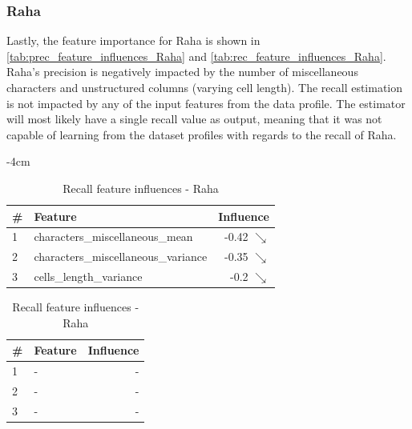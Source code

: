 

\subsubsection{Raha}
Lastly, the feature importance for Raha is shown in \autoref{tab:prec_feature_influences_Raha} and \autoref{tab:rec_feature_influences_Raha}.
Raha's precision is negatively impacted by the number of miscellaneous characters and unstructured columns (varying cell length). The recall estimation is not impacted by any of the input features from the data profile. The estimator will most likely have a single recall value as output, meaning that it was not capable of learning from the dataset profiles with regards to the recall of Raha. 

\begin{table}[H]
	\centering
	\addtolength{\leftskip} {-4cm}
	\addtolength{\rightskip}{-4cm}
	\captionsetup[subtable]{position = below}
	\captionsetup[table]{position=top}
	\caption{Top feature influences - Raha}
	\label{tab:feature_influences_Raha}
		\begin{subtable}{0.5\linewidth}
		\centering
		\begin{tabular}{llr}
\toprule
 \# &                              Feature &         Influence \\
\midrule
 1 &      characters\_miscellaneous\_mean &  -0.42 $\searrow$ \\
 2 &  characters\_miscellaneous\_variance &  -0.35 $\searrow$ \\
 3 &              cells\_length\_variance &   -0.2 $\searrow$ \\
\bottomrule
\end{tabular}
		\caption{Precision feature influences - Raha}
		\label{tab:prec_feature_influences_Raha}
	\end{subtable}
	\hspace*{4em}
	\begin{subtable}{0.5\linewidth}
		\centering
\begin{tabular}{llr}
\toprule
 \# &                              Feature & Influence \\
\midrule
 1 &                - &         - \\
 2 &                     - &         - \\
 3 &  - &         - \\
\bottomrule
\end{tabular}
		\caption{Recall feature influences - Raha}
		\label{tab:rec_feature_influences_Raha}
	\end{subtable}%
\end{table}

